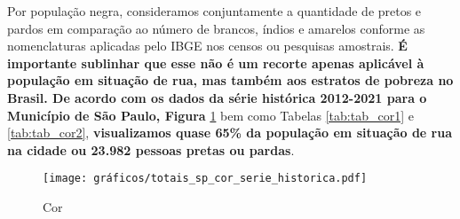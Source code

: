 \documentclass[14pt]{extarticle}
\begin{document}
Por população negra, consideramos conjuntamente a quantidade de pretos e pardos em comparação ao número de brancos, índios e amarelos conforme as nomenclaturas aplicadas pelo IBGE nos censos ou pesquisas amostrais. \textbf{É importante sublinhar que esse não é um recorte apenas aplicável à população em situação de rua, mas também aos estratos de pobreza no Brasil. De acordo com os dados da série histórica 2012-2021 para o Município de São Paulo, Figura} \ref{fig:cor} bem como Tabelas \ref{tab:tab_cor1} e \ref{tab:tab_cor2}, \textbf{visualizamos quase 65\% da população em situação de rua na cidade ou 23.982 pessoas pretas ou pardas}.\\

\begin{figure}[H]
\centering
	\caption{Cor}
	\texttt{[image: gráficos/totais\_sp\_cor\_serie\_historica.pdf]}
	\label{fig:cor}
\end{figure}
\end{document}
